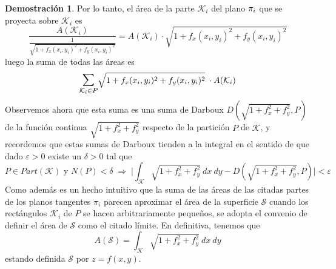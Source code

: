 \documentclass[12pt,twoside]{report}
\newcommand\mc[1]{\mathcal{#1}}
\theoremstyle{azul}
\theoremstyle{azul2}
\theoremstyle{plain}
\theoremstyle{definition}
\newtheorem*{dem}{Demostración}
\theoremstyle{remark}
\begin{document}
\begin{dem}
Por lo tanto, el área de la parte $\mc{K}_i$ del plano $\mathlarger{\pi}_i$ que se proyecta sobre $\mc{K}_i$ es 
$$\dfrac{A(\mc{K}_i)}{\frac{1}{\sqrt{1 + f_x(x_i, y_i)^2 + f_y(x_i, y_i)^2} }} = A(\mc{K}_i) \cdot \sqrt{1 + f_x(x_i, y_i)^2 + f_y(x_i, y_i)^2}  $$
luego la suma de todas las áreas es 
$$\mathlarger{\mathlarger{\sum}}_{\mc{K}_i \in P} \sqrt{1 + f_x(x_i, y_i)^2 + f_y(x_i, y_i)^2} \; \cdot A(\mc{K}_i)$$
Observemos ahora que esta suma es una suma de Darboux $D(\sqrt{1+f_x^2+f_y^2},P)$ de la función continua $\sqrt{1+f_x^2+f_y^2}$ respecto de la partición $P$ de $\mc K$, y recordemos que estas sumas de Darboux tienden a la integral en el sentido de que dado $\varepsilon > 0$ existe un $\delta > 0$ tal que $$P \in Part(\mc K) \text{ y } N(P) < \delta \;\Longrightarrow\; \big|\int_{\mc K} \sqrt{1+f_x^2+f_y^2}\: dx\: dy - D(\sqrt{1+f_x^2+f_y^2},P)\big| < \varepsilon$$
Como además es un hecho intuitivo que la suma de las áreas de las citadas partes de los planos tangentes $\pi_i$ parecen aproximar el área de la superficie $\mc S$ cuando los rectángulos $\mc K_i$ de $P$ se hacen arbitrariamente pequeños, se adopta el convenio de definir el área de $\mc S$ como el citado límite. En definitiva, tenemos que $$A(\mc S) = \int_{\mc K} \sqrt{1+f_x^2+f_y^2} \:dx \:dy$$estando definida $\mc S$ por $z = f(x,y)$.
\end{dem}
\end{document}
